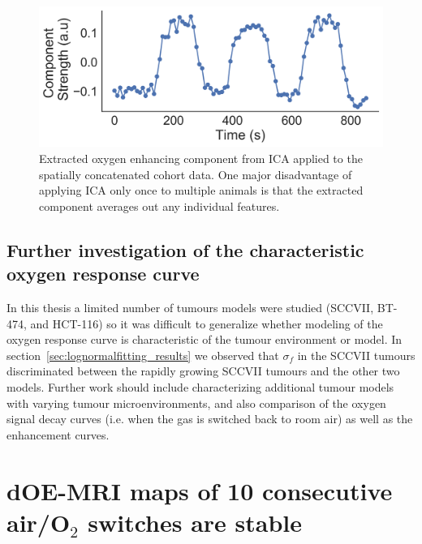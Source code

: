 \begin{figure}[htbp]
   \centering
   \includegraphics[width=\textwidth]{futurework/futurework-images/ISMRM2019_AARTS3_groupICA_OEcomponent.png} %
   \caption{Extracted oxygen enhancing component from \acs{ICA} applied to the spatially concatenated cohort data. One major disadvantage of applying \acs{ICA} only once to multiple animals is that the extracted component averages out any individual features.
   \label{groupICA1}}
\end{figure}

\subsection{Further investigation of the characteristic oxygen response curve}

In this thesis a limited number of tumours models were studied (SCCVII, BT-474, and HCT-116) so it was difficult to generalize whether modeling of the oxygen response curve is characteristic of the tumour environment or model. 
In section~\ref{sec:lognormalfitting_results} we observed that $\sigma_f$ in the SCCVII tumours discriminated between the rapidly growing SCCVII tumours and the other two models.
Further work should include characterizing additional tumour models with varying tumour microenvironments, and also comparison of the oxygen signal decay curves (i.e. when the gas is switched back to room air) as well as the enhancement curves.

\section{dOE-MRI maps of 10 consecutive air/O$_2$ switches are stable}

